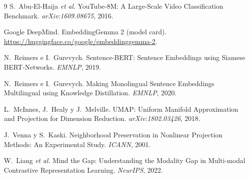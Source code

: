 \documentclass[11pt,a4paper]{article}
\begin{document}
\begin{thebibliography}{9}
  S.~Abu-El-Haija \emph{et al.}
  YouTube-8M: A Large-Scale Video Classification Benchmark.
  \emph{arXiv:1609.08675}, 2016.

  Google DeepMind.
  EmbeddingGemma 2 (model card).
  \url{https://huggingface.co/google/embeddinggemma-2}.

  N.~Reimers e I.~Gurevych.
  Sentence-BERT: Sentence Embeddings using Siamese BERT-Networks.
  \emph{EMNLP}, 2019.

  N.~Reimers e I.~Gurevych.
  Making Monolingual Sentence Embeddings Multilingual using Knowledge Distillation.
  \emph{EMNLP}, 2020.

  L.~McInnes, J.~Healy y J.~Melville.
  UMAP: Uniform Manifold Approximation and Projection for Dimension Reduction.
  \emph{arXiv:1802.03426}, 2018.

  J.~Venna y S.~Kaski.
  Neighborhood Preservation in Nonlinear Projection Methods: An Experimental Study.
  \emph{ICANN}, 2001.

  W.~Liang \emph{et al.}
  Mind the Gap: Understanding the Modality Gap in Multi-modal Contrastive Representation Learning.
  \emph{NeurIPS}, 2022.
\end{thebibliography}
\end{document}
